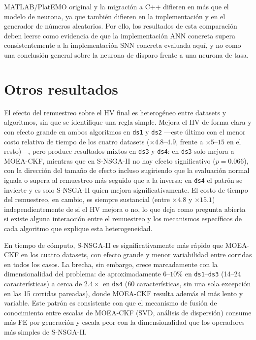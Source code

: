 MATLAB/PlatEMO original y la migración a C++ difieren en más que el modelo de neurona, ya que también difieren en la implementación y en el generador de números aleatorios. Por ello, los resultados de esta comparación deben leerse como evidencia de que la implementación ANN concreta supera consistentemente a la implementación SNN concreta evaluada aquí, y no como una conclusión general sobre la neurona de disparo frente a una neurona de tasa.

\section{Otros resultados}
\label{sec:discusion-otros}

El efecto del remuestreo sobre el HV final es heterogéneo entre datasets y algoritmos, sin que se identifique una regla simple. Mejora el HV de forma clara y con efecto grande en ambos algoritmos en \texttt{ds1} y \texttt{ds2} —este último con el menor costo relativo de tiempo de los cuatro datasets ($\times4.8$--$4.9$, frente a $\times5$--$15$ en el resto)—, pero produce resultados mixtos en \texttt{ds3} y \texttt{ds4}: en \texttt{ds3} solo mejora a MOEA-CKF, mientras que en S-NSGA-II no hay efecto significativo ($p=0.066$), con la dirección del tamaño de efecto incluso sugiriendo que la evaluación normal iguala o supera al remuestreo más seguido que a la inversa; en \texttt{ds4} el patrón se invierte y es solo S-NSGA-II quien mejora significativamente. El costo de tiempo del remuestreo, en cambio, es siempre sustancial (entre $\times4.8$ y $\times15.1$) independientemente de si el HV mejora o no, lo que deja como pregunta abierta si existe alguna interacción entre el remuestreo y los mecanismos específicos de cada algoritmo que explique esta heterogeneidad.

En tiempo de cómputo, S-NSGA-II es significativamente más rápido que MOEA-CKF en los cuatro datasets, con efecto grande y menor variabilidad entre corridas en todos los casos. La brecha, sin embargo, crece marcadamente con la dimensionalidad del problema: de aproximadamente $6$--$10\%$ en \texttt{ds1}--\texttt{ds3} (14--24 características) a cerca de $2.4\times$ en \texttt{ds4} (60 características, sin una sola excepción en las 15 corridas pareadas), donde MOEA-CKF resulta además el más lento y variable. Este patrón es consistente con que el mecanismo de fusión de conocimiento entre escalas de MOEA-CKF (SVD, análisis de dispersión) consume más FE por generación y escala peor con la dimensionalidad que los operadores más simples de S-NSGA-II.

